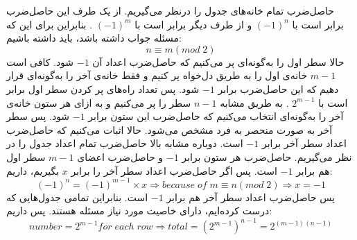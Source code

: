 \p
حاصل‌ضرب تمام خانه‌های جدول را درنظر می‌گیریم. از یک طرف این حاصل‌ضرب برابر است با
$(-1)^n$
و از طرف دیگر برابر است با
$(-1)^m$
. بنابراین برای این که مسئله جواب داشته باشد، باید داشته باشیم:
$$n \equiv m (mod\;2)$$
حالا سطر اول را به‌گونه‌ای پر می‌کنیم که حاصل‌ضرب اعداد آن
$-1$
شود. کافی است
$m - 1$
خانه‌ی اول را به طریق دل‌خواه پر کنیم و فقط خانه‌ی آخر را به‌گونه‌ای قرار دهیم که این حاصل‌ضرب برابر
$-1$
شود. پس تعداد راه‌های پر کردن سطر اول برابر است با
$2^{m-1}$
. به طریق مشابه
$n - 1$
سطر را پر می‌کنیم و به ازای هر ستون خانه‌ی آخر را به‌گونه‌ای انتخاب می‌کنیم که حاصل‌ضرب این ستون برابر
$-1$
شود. پس سطر آخر به صورت منحصر به فرد مشخص می‌شود. حالا اثبات می‌کنیم که حاصل‌ضرب اعداد سطر آخر برابر
$-1$
است. دوباره مشابه بالا حاصل‌ضرب تمام اعداد جدول را در نظر می‌گیریم.
\p
حاصل‌ضرب هر ستون برابر
$-1$
و حاصل‌ضرب اعضای
$m - 1$
سطر اول هم برابر
$-1$
است. پس اگر حاصل‌ضرب اعداد سطر آخر را برابر
$x$
بگیریم، داریم:
$$(-1)^n = (-1)^{m-1} \times x \Rightarrow because\;of\;m \equiv n(mod\;2) \Rightarrow x = -1$$
پس حاصل‌ضرب اعداد سطر آخر هم برابر
$-1$
است. بنابراین تمامی جدول‌هایی که درست کرده‌ایم، دارای خاصیت مورد نیاز مسئله هستند. پس داریم:
$$number = 2^{m-1} for\;each\;row \Rightarrow total = (2^{m-1})^{n-1} = 2^{(m-1)(n-1)}$$